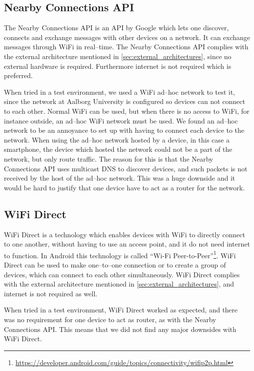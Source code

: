 \subsection{Nearby Connections API}
The Nearby Connections API is an API by Google which lets one discover, connects and exchange messages with other devices on a network. 
It can exchange messages through WiFi in real--time.\cite{nearby_connection} 
The Nearby Connections API complies with the external architecture mentioned in \cref{sec:external_architectures},
since no external hardware is required.
Furthermore internet is not required which is preferred.

When tried in a test environment, we used a WiFi ad--hoc network to test it,
since the network at Aalborg University is configured so devices can not connect to each other.
Normal WiFi can be used, but when there is no access to WiFi, for instance outside, an ad--hoc WiFi network must be used. 
We found an ad--hoc network to be an annoyance to set up with having to connect each device to the network.
When using the ad--hoc network hosted by a device, in this case a smartphone,
the device which hosted the network could not be a part of the network, but only route traffic.
The reason for this is that the Nearby Connections API uses multicast DNS to discover devices,
and such packets is not received by the host of the ad--hoc network.
This was a huge downside and it would be hard to justify that one device have to act as a router for the network.

\subsection{WiFi Direct}
WiFi Direct is a technology which enables devices with WiFi to directly connect to one another,
without having to use an access point, and it do not need internet to function.
In Android this technology is called ``Wi-Fi Peer-to-Peer''\footnote{\url{https://developer.android.com/guide/topics/connectivity/wifip2p.html}}. 
WiFi Direct can be used to make one--to--one connection or to create a group of devices,
which can connect to each other simultaneously.\cite{wifi_direct}
WiFi Direct complies with the external architecture mentioned in \cref{sec:external_architectures}, and internet is not required as well. 

When tried in a test environment, WiFi Direct worked as expected,
and there was no requirement for one device to act as router, as with the Nearby Connections API.
This means that we did not find any major downsides with WiFi Direct.

